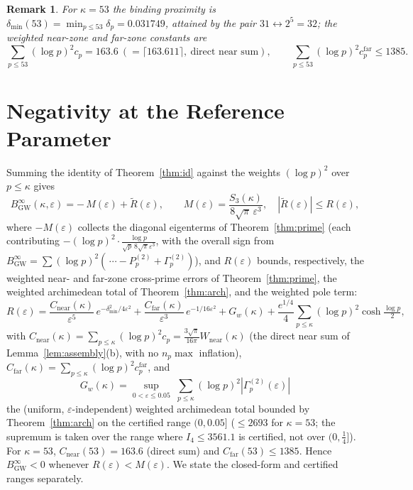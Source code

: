 \documentclass[11pt]{article}
\newtheorem*{remark}{Remark}
\newcommand{\BinfGW}{B_{\mathrm{GW}}^{\infty}}   %
\newcommand{\dmin}{\delta_{\min}}           %
\newcommand{\Pp}{P_p^{(2)}}                 %
\newcommand{\Gp}{\Gamma_p^{(2)}}            %
\begin{document}
\begin{remark}
For $\kappa=53$ the binding proximity is
$\dmin(53)=\min_{p\le 53}\delta_p=0.031749$, attained by the pair
$31\leftrightarrow 2^5=32$; the weighted near-zone and far-zone constants are
\[
\sum_{p\le 53}(\log p)^2 c_p=163.6\ (=\lceil163.611\rceil,\ \text{direct near sum}),
\qquad
\sum_{p\le 53}(\log p)^2 c_p^{\mathrm{far}}\le 1385.
\]
\end{remark}

\section{Negativity at the Reference Parameter}
\label{sec:ref}

Summing the identity of Theorem~\ref{thm:id} against the weights
$(\log p)^2$ over $p\le\kappa$ gives
\begin{equation}\label{eq:assembly}
\BinfGW(\kappa,\varepsilon)
 = -\,M(\varepsilon) + \widetilde R(\varepsilon),
\qquad
M(\varepsilon)=\frac{S_3(\kappa)}{8\sqrt\pi\,\varepsilon^3},
\quad
|\widetilde R(\varepsilon)|\le R(\varepsilon),
\end{equation}
where $-M(\varepsilon)$ collects the diagonal eigenterms of
Theorem~\ref{thm:prime} (each contributing
$-(\log p)^2\cdot\tfrac{\log p}{\sqrt p\,8\sqrt\pi\varepsilon^3}$, with the
overall sign from $\BinfGW=\sum(\log p)^2(\,\cdots-\Pp+\Gp)$), and
$R(\varepsilon)$ bounds, respectively, the weighted near- and far-zone
cross-prime errors of Theorem~\ref{thm:prime}, the weighted archimedean
total of Theorem~\ref{thm:arch}, and the weighted pole term:
\[
R(\varepsilon)
 = \frac{C_{\mathrm{near}}(\kappa)}{\varepsilon^5}\,e^{-\dmin^2/4\varepsilon^2}
 + \frac{C_{\mathrm{far}}(\kappa)}{\varepsilon^3}\,e^{-1/16\varepsilon^2}
 + G_w(\kappa)
 + \frac{e^{1/4}}{4}\sum_{p\le\kappa}(\log p)^2\cosh\tfrac{\log p}{2},
\]
with $C_{\mathrm{near}}(\kappa)=\sum_{p\le\kappa}(\log p)^2 c_p
=\tfrac{3\sqrt\pi}{16\pi}W_{\mathrm{near}}(\kappa)$ (the direct near sum of
Lemma~\ref{lem:assembly}(b), with no $n_p\max$ inflation),
$C_{\mathrm{far}}(\kappa)=\sum_{p\le\kappa}(\log p)^2 c_p^{\mathrm{far}}$, and
\[
G_w(\kappa)=\sup_{0<\varepsilon\le 0.05}\;\sum_{p\le\kappa}(\log p)^2|\Gp(\varepsilon)|
\]
the (uniform, $\varepsilon$-independent) weighted
archimedean total bounded by Theorem~\ref{thm:arch} on the certified range
$(0,0.05]$ ($\le 2693$ for
$\kappa=53$; the supremum is taken over the range where $I_4\le3561.1$ is
certified, not over $(0,\tfrac14]$). For $\kappa=53$, $C_{\mathrm{near}}(53)=163.6$ (direct sum) and
$C_{\mathrm{far}}(53)\le 1385$.
Hence $\BinfGW<0$ whenever $R(\varepsilon)<M(\varepsilon)$.
We state the closed-form and certified ranges separately.
\end{document}
